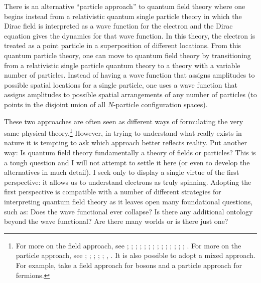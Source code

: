 \documentclass[onecolumn,secnumarabic,amsmath,amssymb,balancelastpage,nofootinbib]{article}
\begin{document}
There is an alternative ``particle approach'' to quantum field theory where one begins instead from a relativistic quantum single particle theory in which the Dirac field is interpreted as a wave function for the electron and the Dirac equation gives the dynamics for that wave function.  In this theory, the electron is treated as a point particle in a superposition of different locations.  From this quantum particle theory, one can move to quantum field theory by transitioning from a relativistic single particle quantum theory to a theory with a variable number of particles.  Instead of having a wave function that assigns amplitudes to possible spatial locations for a single particle, one uses a wave function that assigns amplitudes to possible spatial arrangements of any number of particles (to points in the disjoint union of all $N$-particle configuration spaces).

These two approaches are often seen as different ways of formulating the very same physical theory.\footnote{For more on the field approach, see \citet{jackiw1990}; \citet[chapters 10 and 11]{hatfield}; \citet[chapter 4]{valentini1992}; \citet[section 12.4]{holland}; \citet{valentini1996}; \citet[chapter 3]{peskinschroeder}; \citet[chapter 4]{ryder}; \citet[pg.\ 241--242]{weinberg1999}; \citet{huggett2000}; \citet{wallace2001, wallace2006, wallace2017}; \citet[chapters 2 and 4]{tong}; \citet{baker2009}; \citet{struyve2010}; \citet{duncan}; \citet[section 4.3.1]{myrvold2015}.  For more on the particle approach, see \citet[chapters 6--8]{schweberQFT}; \citet[sec.\ 13.2]{bjorkendrellfields}; \citet{thaller1992}; \citet[chapter 3]{teller}; \citet[section 3]{durr2005}; \citet{deckert}, \citet{wallace2017}.  It is also possible to adopt a mixed approach.  For example, \citet{bohmhiley} take a field approach for bosons and a particle approach for fermions.}  However, in trying to understand what really exists in nature it is tempting to ask which approach better reflects reality.  Put another way:  Is quantum field theory fundamentally a theory of fields or particles?  This is a tough question and I will not attempt to settle it here (or even to develop the alternatives in much detail).  I seek only to display a single virtue of the first perspective: it allows us to understand electrons as truly spinning.  Adopting the first perspective is compatible with a number of different strategies for interpreting quantum field theory as it leaves open many foundational questions, such as:  Does the wave functional ever collapse?  Is there any additional ontology beyond the wave functional?  Are there many worlds or is there just one?
\end{document}
